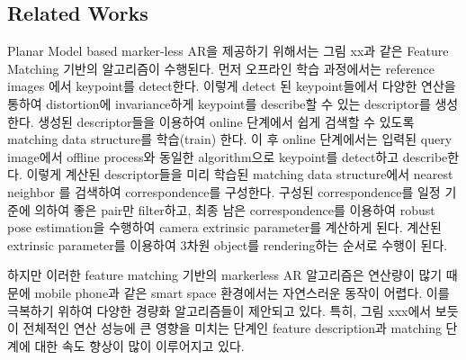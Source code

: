 

\subsection{Related Works}

Planar Model based marker-less AR을 제공하기 위해서는 그림 xx과 같은  Feature Matching 기반의 알고리즘이 수행된다. 먼저 오프라인 학습 과정에서는 reference images 에서 keypoint를 detect한다. 이렇게 detect 된 keypoint들에서 다양한 연산을 통하여 distortion에 invariance하게 keypoint를 describe할 수 있는 descriptor를 생성한다. 생성된 descriptor들을 이용하여 online 단계에서 쉽게 검색할 수 있도록 matching data structure를 학습(train) 한다. 이 후 online 단계에서는 입력된 query image에서 offline process와 동일한 algorithm으로 keypoint를 detect하고 describe한다. 이렇게 계산된 descriptor들을 미리 학습된 matching data structure에서 nearest neighbor 를 검색하여 correspondence를  구성한다. 구성된 correspondence를 일정 기준에 의하여 좋은 pair만 filter하고, 최종 남은 correspondence를 이용하여 robust pose estimation을 수행하여 camera extrinsic parameter를 계산하게 된다. 계산된 extrinsic parameter를 이용하여 3차원 object를 rendering하는 순서로 수행이 된다.

하지만 이러한 feature matching 기반의 markerless AR 알고리즘은 연산량이 많기 때문에 mobile phone과 같은 smart space 환경에서는 자연스러운 동작이 어렵다. 이를 극복하기 위하여 다양한 경량화 알고리즘들이 제안되고 있다. 특히, 그림 xxx에서 보듯이 전체적인 연산 성능에 큰 영향을 미치는 단계인 feature description과 matching 단계에 대한 속도 향상이 많이 이루어지고 있다.

